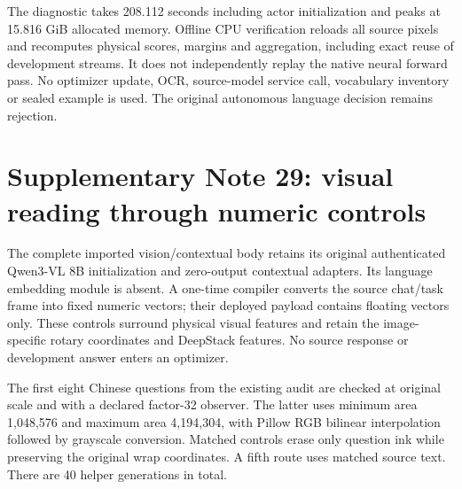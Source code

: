 \documentclass[10pt,a4paper]{article}
\begin{document}
The diagnostic takes 208.112 seconds including actor initialization and peaks
at 15.816 GiB allocated memory. Offline CPU verification reloads all source
pixels and recomputes physical scores, margins and aggregation, including
exact reuse of development streams. It does not independently replay the
native neural forward pass. No optimizer update, OCR, source-model service
call, vocabulary inventory or sealed example is used. The original
autonomous language decision remains rejection.


\section*{Supplementary Note 29: visual reading through numeric controls}
The complete imported vision/contextual body retains its original
authenticated Qwen3-VL 8B initialization and zero-output contextual adapters.
Its language embedding module is absent. A one-time compiler converts the
source chat/task frame into fixed numeric vectors; their deployed payload
contains floating vectors only. These controls surround physical visual
features and retain the image-specific rotary coordinates and DeepStack
features. No source response or development answer enters an optimizer.

The first eight Chinese questions from the existing audit are checked at
original scale and with a declared factor-32 observer. The latter uses
minimum area 1,048,576 and maximum area 4,194,304, with Pillow RGB bilinear
interpolation followed by grayscale conversion. Matched controls erase only
question ink while preserving the original wrap coordinates. A fifth route
uses matched source text. There are 40 helper generations in total.
\end{document}
